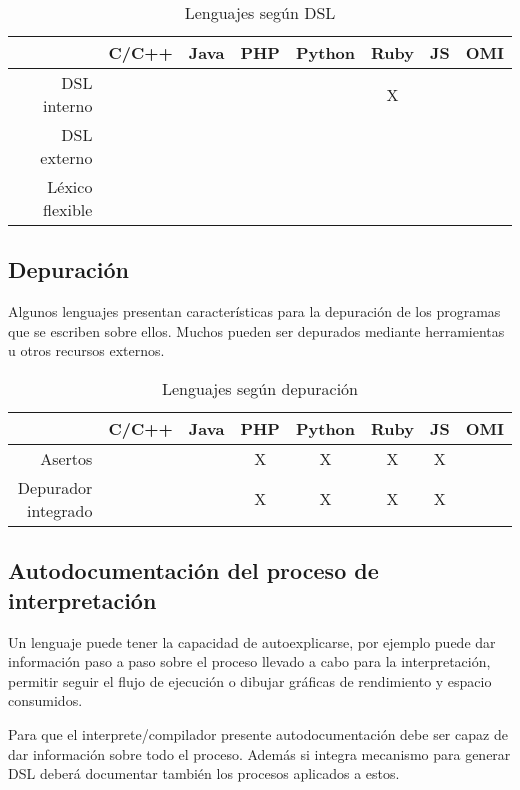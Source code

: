 \FloatBarrier
\begin{table}[h]
\begin{center}
 
\begin{tabular}{|r|c|c|c|c|c|c|c|} \hline
 & C/C++ & Java & PHP  & Python & Ruby & JS & OMI\\ \hline
DSL interno & & &  &  &  X &   &  \\ \hline
DSL externo & & &  &  &  &  &  \\ \hline
Léxico flexible & & &  &  &  &  &  \\ \hline
\end{tabular}
\caption{Lenguajes según DSL}
\end{center}
\end{table}
\FloatBarrier

\subsection{Depuración}
Algunos lenguajes presentan características para la depuración de los programas que se escriben 
sobre ellos. Muchos pueden ser depurados mediante herramientas u otros recursos 
externos. 

\FloatBarrier
\begin{table}[h]
\begin{center}
 
\begin{tabular}{|r|c|c|c|c|c|c|c|} \hline
 & C/C++ & Java & PHP  & Python & Ruby & JS & OMI\\ \hline
Asertos   & & & X & X &  X & X  &  \\ \hline
Depurador integrado & & & X & X & X & X &  \\ \hline
\end{tabular}
\caption{Lenguajes según depuración}
\end{center}
\end{table}
\FloatBarrier


\subsection{Autodocumentación del proceso de interpretación} 
Un lenguaje puede tener la capacidad de autoexplicarse, por ejemplo puede dar información 
paso a paso sobre el proceso llevado a cabo para la interpretación, permitir 
seguir el flujo de ejecución o dibujar gráficas de rendimiento y espacio consumidos.

Para que el interprete/compilador presente autodocumentación debe ser capaz de dar información sobre todo 
el proceso. Además si integra mecanismo para generar DSL deberá documentar también los procesos
aplicados a estos. 

